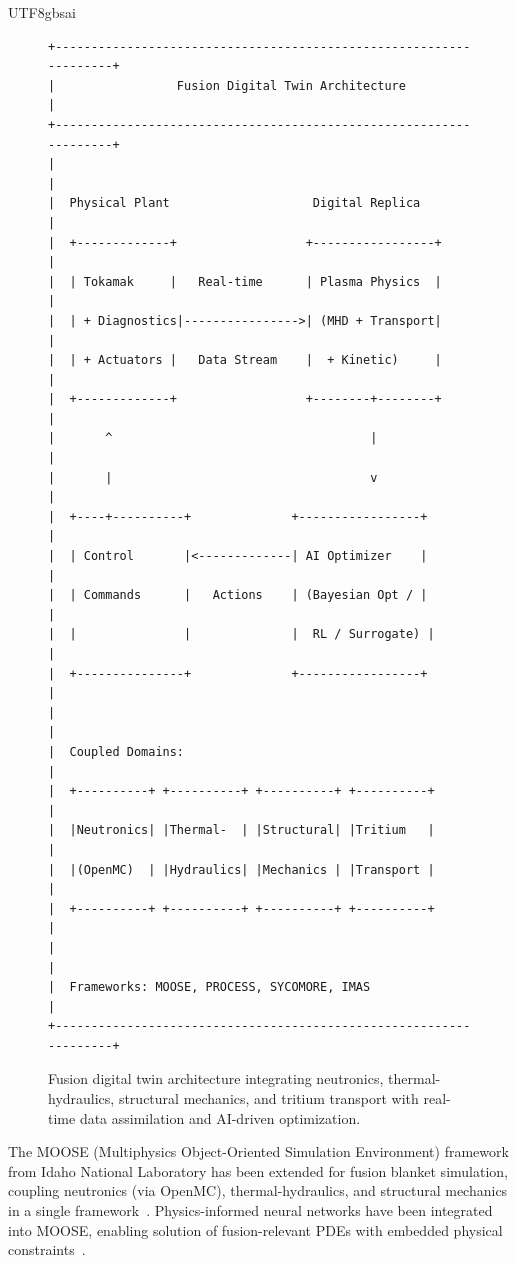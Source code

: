 \documentclass[12pt,a4paper]{article}
\begin{document}
\begin{CJK}{UTF8}{gbsai}
\begin{figure}[htbp]
\centering
\small
\begin{verbatim}
+-------------------------------------------------------------------+
|                 Fusion Digital Twin Architecture                   |
+-------------------------------------------------------------------+
|                                                                   |
|  Physical Plant                    Digital Replica                 |
|  +-------------+                  +-----------------+            |
|  | Tokamak     |   Real-time      | Plasma Physics  |            |
|  | + Diagnostics|---------------->| (MHD + Transport|            |
|  | + Actuators |   Data Stream    |  + Kinetic)     |            |
|  +-------------+                  +--------+--------+            |
|       ^                                    |                      |
|       |                                    v                      |
|  +----+----------+              +-----------------+              |
|  | Control       |<-------------| AI Optimizer    |              |
|  | Commands      |   Actions    | (Bayesian Opt / |              |
|  |               |              |  RL / Surrogate) |              |
|  +---------------+              +-----------------+              |
|                                                                   |
|  Coupled Domains:                                                 |
|  +----------+ +----------+ +----------+ +----------+             |
|  |Neutronics| |Thermal-  | |Structural| |Tritium   |             |
|  |(OpenMC)  | |Hydraulics| |Mechanics | |Transport |             |
|  +----------+ +----------+ +----------+ +----------+             |
|                                                                   |
|  Frameworks: MOOSE, PROCESS, SYCOMORE, IMAS                       |
+-------------------------------------------------------------------+
\end{verbatim}
\caption{Fusion digital twin architecture integrating neutronics, thermal-hydraulics, structural mechanics, and tritium transport with real-time data assimilation and AI-driven optimization.}
\label{fig:digital-twin}
\end{figure}

The MOOSE (Multiphysics Object-Oriented Simulation Environment) framework from Idaho National Laboratory has been extended for fusion blanket simulation, coupling neutronics (via OpenMC), thermal-hydraulics, and structural mechanics in a single framework~\citep{Andrson2024MOOSE}. Physics-informed neural networks have been integrated into MOOSE, enabling solution of fusion-relevant PDEs with embedded physical constraints~\citep{Isfar2024}.


\end{CJK}
\end{document}
